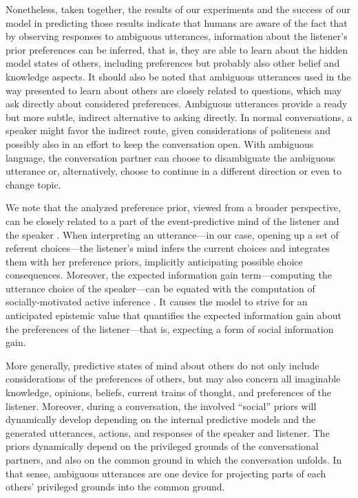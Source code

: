 \documentclass[10pt,a4paper]{article}
\begin{document}
Nonetheless, taken together, the results of our experiments and the success of our model in predicting those results indicate that humans are aware of the fact that by observing responses to ambiguous utterances, information about the listener's prior preferences can be inferred, that is, they are able to learn about the hidden model states of others, including preferences but probably also other belief and knowledge aspects. 
It should also be noted that ambiguous utterances used in the way presented to learn about others are closely related to questions, which may ask directly about considered preferences. 
Ambiguous utterances provide a ready but more subtle, indirect alternative to asking directly. 
In normal conversations, a speaker might favor the indirect route, given considerations of politeness and possibly also in an effort to keep the conversation open. 
With ambiguous language, the conversation partner can choose to disambiguate the ambiguous utterance or, alternatively, choose to continue in a different direction or even to change topic.


We note that the analyzed preference prior, viewed from a broader perspective, can be closely related to a part of the event-predictive mind of the listener and the speaker \cite{Butz:2016,Butz:2017}. 
When interpreting an utterance---in our case, opening up a set of referent choices---the listener's mind infers the current choices and integrates them with her preference priors, implicitly anticipating possible choice consequences.
Moreover, the expected information gain term---computing the utterance choice of the speaker---can be equated with the computation of socially-motivated active inference \cite{Butz:2017a,Friston:2015}.
It causes the model to strive for an anticipated epistemic value that quantifies the expected information gain about the preferences of the listener---that is, expecting a form of social information gain. 


More generally, predictive states of mind about others do not only include considerations of the preferences of others, but may also concern all imaginable knowledge, opinions, beliefs, current trains of thought, and preferences of the listener.
Moreover, during a conversation, the involved ``social'' priors will dynamically develop depending on the internal predictive models and the generated utterances, actions, and responses of the speaker and listener. 
The priors dynamically depend on the privileged grounds of the conversational partners, and also on the common ground in which the conversation unfolds.
In that sense, ambiguous utterances are one device for projecting parts of each others' privileged grounds into the common ground. 
\end{document}
